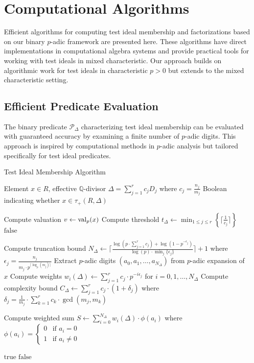 \section{Computational Algorithms}\label{sec:computational_algorithms}

Efficient algorithms for computing test ideal membership and factorizations based on our binary $p$-adic framework are presented here. These algorithms have direct implementations in computational algebra systems and provide practical tools for working with test ideals in mixed characteristic. Our approach builds on algorithmic work for test ideals in characteristic $p > 0$ \cite{MR18} but extends to the mixed characteristic setting.

\subsection{Efficient Predicate Evaluation}

The binary predicate $\mathcal{P}_\Delta$ characterizing test ideal membership can be evaluated with guaranteed accuracy by examining a finite number of $p$-adic digits. This approach is inspired by computational methods in $p$-adic analysis \cite{BS22} but tailored specifically for test ideal predicates.

\begin{algorithm}[H]
\caption{Test Ideal Membership Algorithm}
\label{alg:test-ideal-membership}
\begin{algorithmic}[1]
\Require Element $x \in R$, effective $\mathbb{Q}$-divisor $\Delta = \sum_{j=1}^{r} c_j D_j$ where $c_j = \frac{n_j}{m_j}$
\Ensure Boolean indicating whether $x \in \tau_+(R,\Delta)$

\State Compute valuation $v \gets \operatorname{val}_p(x)$
\State Compute threshold $t_\Delta \gets \min_{1 \leq j \leq r} \left\{\lceil\frac{1}{c_j}\rceil\right\}$
    \State \Return $\text{false}$
\EndIf

\State Compute truncation bound $N_\Delta \gets \lceil\frac{\log(p \cdot \sum_{j=1}^{r} c_j) + \log(1-p^{-\epsilon_j})}{\log(p) \cdot \min_j \{\epsilon_j\}}\rceil + 1$ where $\epsilon_j = \frac{n_j}{m_j \cdot p^{\lceil\log_p(m_j)\rceil}}$
\State Extract $p$-adic digits $(a_0, a_1, \ldots, a_{N_\Delta})$ from $p$-adic expansion of $x$
\State Compute weights $w_i(\Delta) \gets \sum_{j=1}^{r} c_j \cdot p^{-i\epsilon_j}$ for $i = 0, 1, \ldots, N_\Delta$
\State Compute complexity bound $C_\Delta \gets \sum_{j=1}^{r} c_j \cdot (1 + \delta_j)$ where $\delta_j = \frac{1}{m_j} \cdot \sum_{k=1}^{r} c_k \cdot \gcd(m_j, m_k)$

\State Compute weighted sum $S \gets \sum_{i=0}^{N_\Delta} w_i(\Delta) \cdot \phi(a_i)$ where $\phi(a_i) = \begin{cases} 0 & \text{if } a_i = 0 \\ 1 & \text{if } a_i \neq 0 \end{cases}$

    \State \Return $\text{true}$
\Else
    \State \Return $\text{false}$
\EndIf
\end{algorithmic}
\end{algorithm}

